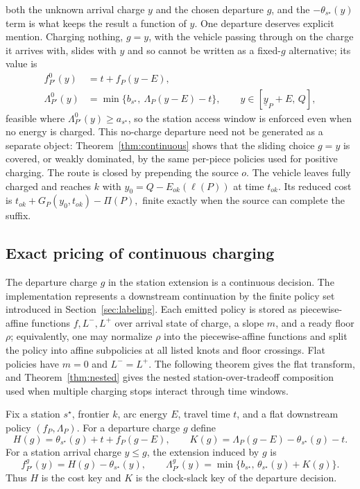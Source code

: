 \documentclass[review,3p,authoryear]{elsarticle}
\theoremstyle{plain}
\theoremstyle{definition}
\theoremstyle{remark}
\begin{document}
both the unknown arrival charge \(y\) and the chosen departure \(g\), and the
\(-\theta_{s^\star}(y)\) term is what keeps the result a function of \(y\). One departure
deserves explicit mention. Charging nothing, \(g=y\), with the vehicle passing
through on the charge it arrives with, slides with \(y\) and so cannot be written as a
fixed-$g$ alternative; its value is
\begin{equation}
\label{eq:ref-stat-nc}
\begin{aligned}
f^{0}_{P'}(y)&=t+f_P(y-E),\\
\Lambda^{0}_{P'}(y)&=\min\{b_{s^\star},\ \Lambda_P(y-E)-t\},
\qquad y\in[\underline{y}_P+E,\,Q],
\end{aligned}
\end{equation}
feasible where $\Lambda^{0}_{P'}(y)\ge a_{s^\star}$, so the station access window is
enforced even when no energy is charged. This no-charge departure need not be generated
as a separate object: Theorem~\ref{thm:continuous} shows that the sliding choice \(g=y\)
is covered, or weakly dominated, by the same per-piece policies used for positive
charging. The route is closed
by prepending the source
$o$. The vehicle leaves fully charged and reaches $k$ with
$y_0=Q-E_{ok}(\ell(P))$ at time $t_{ok}$. Its reduced cost is $ t_{ok}+G_P(y_0,t_{ok})-\Pi(P),$ finite exactly when the source can complete the suffix.

\subsection{Exact pricing of continuous charging}
\label{sec:continuous}

The departure charge $g$ in the station extension is a continuous decision.
The implementation represents a downstream continuation by the finite policy set
introduced in Section~\ref{sec:labeling}. Each emitted policy is stored as
piecewise-affine functions $f,L^-,L^+$ over arrival state of charge, a slope $m$,
and a ready floor $\rho$; equivalently, one may normalize $\rho$ into the
piecewise-affine functions and split the policy into affine subpolicies at all
listed knots and floor crossings. Flat policies have $m=0$ and $L^-=L^+$. The
following theorem gives the flat transform, and
Theorem~\ref{thm:nested} gives the nested station-over-tradeoff composition used
when multiple charging stops interact through time windows.

Fix a station $s^\star$, frontier $k$, arc energy $E$, travel time $t$, and a flat
downstream policy $(f_P,\Lambda_P)$. For a departure charge $g$ define
\begin{equation}
\label{eq:keys}
H(g)=\theta_{s^\star}(g)+t+f_P(g-E),\qquad
K(g)=\Lambda_P(g-E)-\theta_{s^\star}(g)-t .
\end{equation}
For a station arrival charge \(y\le g\), the extension induced by \(g\) is
\[
f^{g}_{P'}(y)=H(g)-\theta_{s^\star}(y),\qquad
\Lambda^{g}_{P'}(y)=\min\{b_{s^\star},\,\theta_{s^\star}(y)+K(g)\}.
\]
Thus $H$ is the cost key and $K$ is the clock-slack key of the departure decision.
\end{document}

